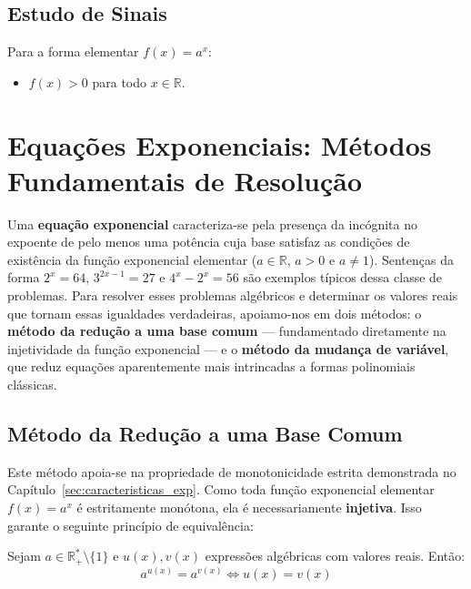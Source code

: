 \documentclass[12pt,a4paper]{report}
\begin{document}
	\section{Estudo de Sinais}
	\begin{destaque}
		Para a forma elementar $f(x) = a^x$:
		\begin{itemize}
			\item $f(x) > 0$ para todo $x \in \mathbb{R}$.
		\end{itemize}
	\end{destaque}
	
	\chapter{Equações Exponenciais: Métodos Fundamentais de Resolução}
	\label{sec:equacoes_exp}
	
	Uma \textbf{equação exponencial} caracteriza-se pela presença da incógnita no expoente de pelo menos uma potência cuja base satisfaz as condições de existência da função exponencial elementar ($a \in \mathbb{R}$, $a > 0$ e $a \neq 1$). Sentenças da forma $2^x = 64$, $3^{2x-1} = 27$ e $4^x - 2^x = 56$ são exemplos típicos dessa classe de problemas. Para resolver esses problemas algébricos e determinar os valores reais que tornam essas igualdades verdadeiras, apoiamo-nos em dois métodos: o \textbf{método da redução a uma base comum} — fundamentado diretamente na injetividade da função exponencial — e o \textbf{método da mudança de variável}, que reduz equações aparentemente mais intrincadas a formas polinomiais clássicas.
	
	\section{Método da Redução a uma Base Comum}
	\label{subsec:metodo_base_comum}
	
	Este método apoia-se na propriedade de monotonicidade estrita demonstrada no Capítulo~\ref{sec:caracteristicas_exp}. Como toda função exponencial elementar $f(x) = a^x$ é estritamente monótona, ela é necessariamente \textbf{injetiva}. Isso garante o seguinte princípio de equivalência:
	
	\begin{destaque}
		Sejam $a \in \mathbb{R}^*_+ \setminus \{1\}$ e $u(x), v(x)$ expressões algébricas com valores reais. Então:
		\[
		a^{u(x)} = a^{v(x)} \iff u(x) = v(x)
		\]
	\end{destaque}
	
\end{document}
